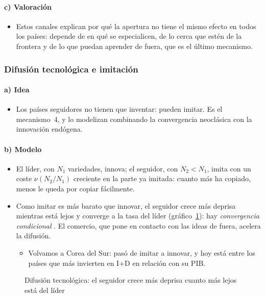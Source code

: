 \documentclass[11pt]{article}
\begin{document}
\paragraph{c) Valoración}

\begin{itemize}
\item Estos canales explican por qué la apertura no tiene el mismo efecto en todos los países: depende de en qué se especialicen, de lo cerca que estén de la frontera y de lo que puedan aprender de fuera, que es el último mecanismo.
\end{itemize}

\subsubsection{Difusión tecnológica e imitación}\label{sec:difusion}

\paragraph{a) Idea}

\begin{itemize}
\item Los países seguidores no tienen que inventar: pueden imitar. Es el mecanismo~4, y \textcite{BarroSalaiMartin1997Technological} lo modelizan combinando la convergencia neoclásica con la innovación endógena.
\end{itemize}

\paragraph{b) Modelo}

\begin{itemize}
\item El líder, con $N_1$ variedades, innova; el seguidor, con $N_2<N_1$, imita con un coste $\nu(N_2/N_1)$ creciente en la parte ya imitada: cuanto más ha copiado, menos le queda por copiar fácilmente.
\item Como imitar es más barato que innovar, el seguidor crece más deprisa mientras está lejos y converge a la tasa del líder (gráfico~\ref{fig:difusion}): hay \emph{convergencia condicional} . El comercio, que pone en contacto con las ideas de fuera, acelera la difusión.
  \begin{itemize}
  \item Volvamos a Corea del Sur: pasó de imitar a innovar, y hoy está entre los países que más invierten en I+D en relación con su PIB.
  \end{itemize}
\end{itemize}
\begin{figure}[H]
\centering
\caption{Difusión tecnológica: el seguidor crece más deprisa cuanto más lejos está del líder}\label{fig:difusion}
\end{figure}
\end{document}

